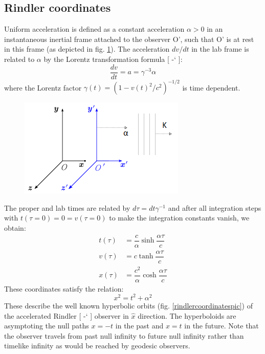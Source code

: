 \documentclass[%
 aip,
 jmp,%
 amsmath,amssymb,
 reprint,%
]{revtex4-1}
\newcommand*{\citen}[1]{%
  \begingroup
    \romannumeral-`\x %
    \setcitestyle{numbers}%
    \cite{#1}%
  \endgroup   
}
\begin{document}
\subsection{Rindler coordinates}
Uniform acceleration is defined as a constant acceleration $\alpha > 0$ in an instantaneous inertial frame attached to the observer O', such that O' is at rest in this frame (as depicted in fig. \ref{framespic}). The acceleration $dv/dt$ in the lab frame is related to $\alpha$ by the Lorentz transformation formula [\citen{lorentztransformations}]:
\begin{equation}
\frac{dv}{dt}= a = \gamma^{-3} \alpha
\end{equation}
where the Lorentz factor  $\gamma(t) = \left(1-v(t)^2/c^2\right)^{-1/2}$ is time dependent. 
\begin{figure}[H]
\centering
\includegraphics[width=1.0\linewidth]{frames.png}
  \label{framespic}
\end{figure}
The proper and lab times are related by $d\tau=dt \gamma^{-1}$ and after all integration steps with $t(\tau=0)=0=v(\tau=0)$ to make the integration constants vanish, we obtain:
\begin{align}
    t(\tau) & =\dfrac{c}{\alpha}\sinh{\dfrac{\alpha \tau}{c}} \\
    v(\tau) & =c\tanh{\dfrac{\alpha \tau}{c}} 
    \label{vtau}\\
    x(\tau) & =\dfrac{c^2}{\alpha}\cosh{\dfrac{\alpha \tau}{c}} 
\end{align}
These coordinates satisfy the relation:
\begin{equation}
x^2=t^2+\alpha^2
\end{equation}
These describe the well known hyperbolic orbits (fig. \ref{rindlercoordinatespic}) of the accelerated Rindler [\citen{rindlercoordinates}] observer in $\hat{x}$ direction.  The hyperboloids are asymptoting the null paths $x= -t$ in the past and $x= t$ in the future. Note that the observer travels from past null infinity to future null infinity rather than timelike infinity as would be reached by geodesic observers.\\
\end{document}
